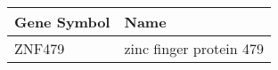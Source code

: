 \begin{tabular}{ll}
\toprule
Gene Symbol &                    Name \\
\midrule
     ZNF479 & zinc finger protein 479 \\
\bottomrule
\end{tabular}

